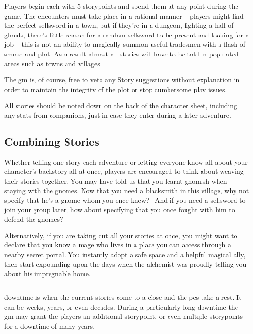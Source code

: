 \begin{multicols}{2}

\noindent
Players begin each with 5 \glspl{storypoint} and spend them at any point during the game.
The encounters must take place in a rational manner -- players might find the perfect sellsword in a town, but if they're in a dungeon, fighting a hall of ghouls, there's little reason for a random sellsword to be present and looking for a job -- this is not an ability to magically summon useful tradesmen with a flash of smoke and plot.
As a result almost all stories will have to be told in populated areas such as towns and villages.

The \gls{gm} is, of course, free to veto any Story suggestions without explanation in order to maintain the integrity of the plot or stop cumbersome play issues.

All stories should be noted down on the back of the character sheet, including any stats from companions, just in case they enter during a later adventure.

\subsection{Combining Stories}

Whether telling one story each adventure or letting everyone know all about your character's backstory all at once, players are encouraged to think about weaving their stories together. You may have told us that you learnt gnomish when staying with the gnomes. Now that you need a blacksmith in this village, why not specify that he's a gnome whom you once knew? \ And if you need a sellsword to join your group later, how about specifying that you once fought with him to defend the gnomes?

Alternatively, if you are taking out all your stories at once, you might want to declare that you know a mage who lives in a place you can access through a nearby secret portal. You instantly adopt a safe space and a helpful magical ally, then start expounding upon the days when the alchemist was proudly telling you about his impregnable home.

\subsection{}

\Gls{downtime} is when the current stories come to a close and the \glspl{pc} take a rest.
It can be weeks, years, or even decades.
During a particularly long \gls{downtime} the \gls{gm} may grant the players an additional \gls{storypoint}, or even multiple \glspl{storypoint} for a downtime of many years.


\end{multicols}
